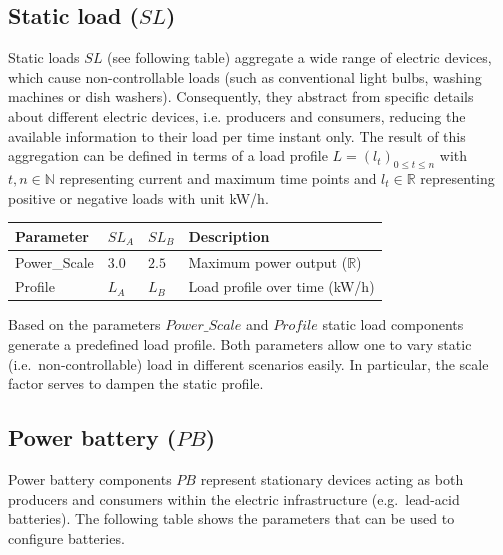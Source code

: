 \subsection{Static load ($SL$)}

Static loads $SL$ (see following table) aggregate a wide range of electric devices, which cause non-controllable loads (such as conventional light bulbs, washing machines or dish washers). Consequently, they abstract from specific details about different electric devices, i.e. producers and consumers, reducing the available information to their load per time instant only. The result of this aggregation can be defined in terms of a load profile $L = (l_t)_{0 \leq t \leq n}$ with $t,n \in \mathbb{N}$ representing current and maximum time points and $l_t \in \mathbb{R}$ representing positive or negative loads with unit kW/h.

\begin{table}[h]
	\renewcommand{\arraystretch}{1.3}
	\centering
	\begin{tabularx}{\columnwidth}{lllX}
		\hline
		\textbf{Parameter}              & \textbf{$SL_{A}$}  & \textbf{$SL_{B}$}   & \textbf{Description} \\ \hline
		Power\_Scale                   	  & $3.0$ & $2.5$ & Maximum power output ($\mathbb{R}$) \\
		Profile                       	  	   & $L_A$ & $L_B$ & Load profile over time  (kW/h)\\ \hline
	\end{tabularx}
\end{table}

Based on the parameters $Power\_Scale$ and $Profile$ static load components generate a predefined load profile. Both parameters allow one to vary static (i.e.\ non-controllable) load in different scenarios easily. In particular, the scale factor serves to dampen the static profile.

\subsection{Power battery ($PB$)}

Power battery components $PB$ represent stationary devices acting as both producers and consumers within the electric infrastructure (e.g.\ lead-acid batteries). The following table shows the parameters that can be used to configure batteries.

